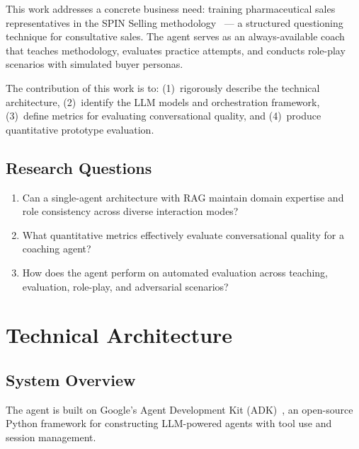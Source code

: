 \documentclass[10pt,twocolumn,a4paper]{article}
\begin{document}
This work addresses a concrete business need: training pharmaceutical sales representatives in the SPIN Selling methodology~\cite{rackham1988spin} --- a structured questioning technique for consultative sales. The agent serves as an always-available coach that teaches methodology, evaluates practice attempts, and conducts role-play scenarios with simulated buyer personas.

The contribution of this work is to: (1)~rigorously describe the technical architecture, (2)~identify the LLM models and orchestration framework, (3)~define metrics for evaluating conversational quality, and (4)~produce quantitative prototype evaluation.

\subsection{Research Questions}
\begin{enumerate}[leftmargin=*,noitemsep,topsep=2pt]
    \item[\textbf{RQ1:}] Can a single-agent architecture with RAG maintain domain expertise and role consistency across diverse interaction modes?
    \item[\textbf{RQ2:}] What quantitative metrics effectively evaluate conversational quality for a coaching agent?
    \item[\textbf{RQ3:}] How does the agent perform on automated evaluation across teaching, evaluation, role-play, and adversarial scenarios?
\end{enumerate}

\section{Technical Architecture}
\label{sec:architecture}

\subsection{System Overview}

The agent is built on Google's Agent Development Kit (ADK)~\cite{googleadk2024}, an open-source Python framework for constructing LLM-powered agents with tool use and session management.
\end{document}
